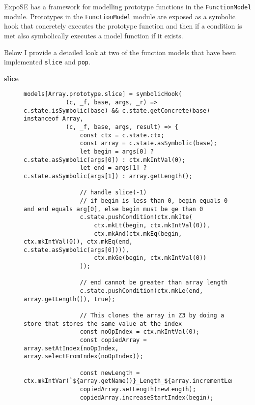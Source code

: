 \documentclass[]{final_report}
\begin{document}
ExpoSE has a framework for modelling prototype functions in the \lstinline|FunctionModel| module. Prototypes in the \lstinline|FunctionModel| module are exposed as a symbolic hook that concretely executes the prototype function and then if a condition is met also symbolically executes a model function if it exists. 

Below I provide a detailed look at two of the function models that have been implemented \lstinline|slice| and \lstinline|pop|.

\textbf{slice} \label{slice-function-model}
\begin{figure}[t]
\begin{lstlisting}
models[Array.prototype.slice] = symbolicHook(
            (c, _f, base, args, _r) => c.state.isSymbolic(base) && c.state.getConcrete(base) instanceof Array,
            (c, _f, base, args, result) => {
                const ctx = c.state.ctx;
                const array = c.state.asSymbolic(base);
                let begin = args[0] ? c.state.asSymbolic(args[0]) : ctx.mkIntVal(0);
                let end = args[1] ? c.state.asSymbolic(args[1]) : array.getLength();

                // handle slice(-1)
                // if begin is less than 0, begin equals 0 and end equals arg[0], else begin must be ge than 0
                c.state.pushCondition(ctx.mkIte(
                    ctx.mkLt(begin, ctx.mkIntVal(0)), 
                    ctx.mkAnd(ctx.mkEq(begin, ctx.mkIntVal(0)), ctx.mkEq(end, c.state.asSymbolic(args[0]))),
                    ctx.mkGe(begin, ctx.mkIntVal(0))
                ));

                // end cannot be greater than array length
                c.state.pushCondition(ctx.mkLe(end, array.getLength()), true);

                // This clones the array in Z3 by doing a store that stores the same value at the index
                const noOpIndex = ctx.mkIntVal(0);
                const copiedArray = array.setAtIndex(noOpIndex, array.selectFromIndex(noOpIndex));
                
                const newLength = ctx.mkIntVar(`${array.getName()}_Length_${array.incrementLengthCounter()}`);
                copiedArray.setLength(newLength);
                copiedArray.increaseStartIndex(begin);


\end{lstlisting}
\end{figure}
\end{document}
